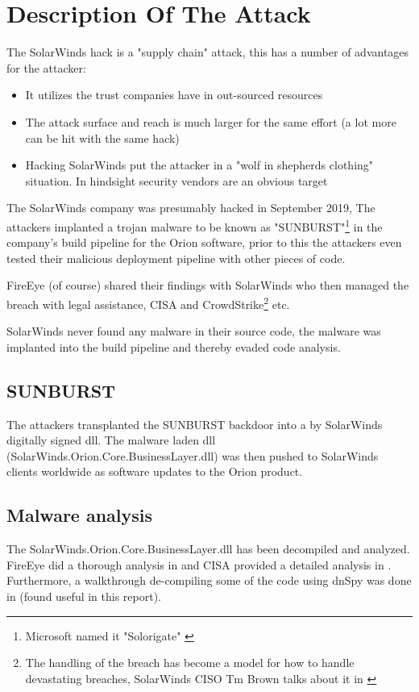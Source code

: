 \documentclass[
	letterpaper, %
	10pt, %
	unnumberedsections, %
	twoside, %
]{LTJournalArticle}
\begin{document}
\section{Description Of The Attack} 
The SolarWinds hack is a "supply chain" attack, this has a number of advantages for the attacker:

\begin{itemize}
	\item It utilizes the trust companies have in out-sourced resources 
	\item The attack surface and reach is much larger for the same effort (a lot more can be hit with the same hack)
	\item Hacking SolarWinds put the attacker in a "wolf in shepherds clothing" situation. In hindsight security vendors are an obvious target
\end{itemize} 

The SolarWinds company was presumably hacked in September 2019\cite{TechTargetSolarwinds}, The attackers implanted a trojan malware to be known as "SUNBURST"\footnote{Microsoft named it "Solorigate" \cite{MicrosoftSolarwinds}} in the company's build pipeline for the Orion software, prior to this the attackers even tested their malicious deployment pipeline with other pieces of code\cite{orangematterSunburst}. 
\par
FireEye (of course) shared their findings with SolarWinds who then managed the breach with legal assistance, CISA and CrowdStrike\footnote{The handling of the breach has become a model for how to handle devastating breaches, SolarWinds CISO Tm Brown talks about it in \cite{CISA_sunburst}} etc.   

SolarWinds never found any malware in their source code, the malware was implanted into the build pipeline and thereby evaded code analysis. 

\subsection{SUNBURST}
The attackers transplanted the SUNBURST backdoor into a by SolarWinds digitally signed dll. The malware laden dll (SolarWinds.Orion.Core.BusinessLayer.dll\cite{Mandiant}) was then pushed to SolarWinds clients worldwide as software updates to the Orion product.

\subsection{Malware analysis}     
The SolarWinds.Orion.Core.BusinessLayer.dll has been decompiled and analyzed\cite{SolarWindsOrionCoreBusinessLayerdll}. FireEye did a thorough analysis in\cite{Mandiant} and CISA provided a detailed analysis in \cite{CISA_sunburst}. Furthermore, a walkthrough de-compiling some of the code using dnSpy was done in \cite{cybercdh}(found useful in this report).
\end{document}
